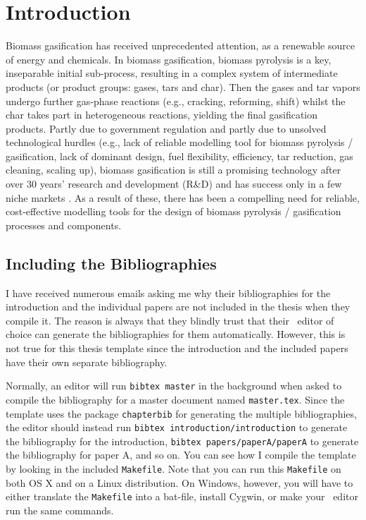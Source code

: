 \section{Introduction}\label{sec:introduction}
Biomass gasification has received unprecedented attention, as a renewable source of energy and chemicals. In biomass gasification, biomass pyrolysis is a key, inseparable initial sub-process, resulting in a complex system of intermediate products (or product groups: gases, tars and char). Then the gases and tar vapors undergo further gas-phase reactions (e.g., cracking, reforming, shift) whilst the char takes part in heterogeneous reactions, yielding the final gasification products. Partly due to government regulation and partly due to unsolved technological hurdles (e.g., lack of reliable modelling tool for biomass pyrolysis / gasification, lack of dominant design, fuel flexibility, efficiency, tar reduction, gas cleaning, scaling up), biomass gasification is still a promising technology after over 30 years’ research and development (R\&D) and has success only in a few niche markets \cite {1}. As a result of these, there has been a compelling need for reliable, cost-effective modelling tools for the design of biomass pyrolysis / gasification processes and components.

\subsection{Including the Bibliographies}
I have received numerous emails asking me why their bibliographies for the introduction and the individual papers are not included in the thesis when they compile it. The reason is always that they blindly trust that their \LaTeXe\ editor of choice can generate the bibliographies for them automatically. However, this is not true for this thesis template since the introduction and the included papers have their own separate bibliography.

Normally, an editor will run {\tt bibtex master} in the background when asked to compile the bibliography for a master document named {\tt master.tex}. Since the template uses the package {\tt chapterbib} for generating the multiple bibliographies, the editor should instead run {\tt bibtex introduction/introduction} to generate the bibliography for the introduction, {\tt bibtex papers/paperA/paperA} to generate the bibliography for paper A, and so on. You can see how I compile the template by looking in the included {\tt Makefile}. Note that you can run this {\tt Makefile} on both OS X and on a Linux distribution. On Windows, however, you will have to either translate the {\tt Makefile} into a bat-file, install Cygwin, or make your \LaTeXe\ editor run the same commands.

